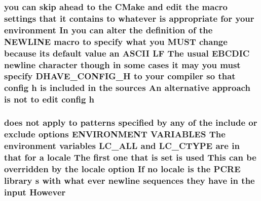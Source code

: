 \subsubsection[{\texorpdfstring{h}{h}}]{\setlength{\rightskip}{0pt plus 5cm}you {\bf can} {\bf skip} ahead {\bf to} the C\+Make and edit the macro settings that {\bf it} {\bf contains} {\bf to} whatever {\bf is} appropriate for your {\bf environment} In you {\bf can} alter the definition {\bf of} the {\bf N\+E\+W\+L\+I\+NE} macro {\bf to} specify {\bf what} you M\+U\+ST change because its {\bf default} {\bf value} an {\bf A\+S\+C\+II} {\bf LF} The usual E\+B\+C\+D\+IC {\bf newline} {\bf character} {\bf though} {\bf in} some {\bf cases} {\bf it} may you must specify D\+H\+A\+V\+E\+\_\+\+C\+O\+N\+F\+I\+G\+\_\+H {\bf to} your {\bf compiler} {\bf so} that config h {\bf is} {\bf included} {\bf in} the sources An alternative approach {\bf is} {\bf not} {\bf to} edit config h}\hypertarget{NON-AUTOTOOLS-BUILD_8txt_ac92abcdacf639432fec4387e50a71c43}{}\label{NON-AUTOTOOLS-BUILD_8txt_ac92abcdacf639432fec4387e50a71c43}
\subsubsection[{\texorpdfstring{However}{However}}]{ does {\bf not} apply {\bf to} {\bf patterns} {\bf specified} by {\bf any} {\bf of} the {\bf include} {\bf or} {\bf exclude} {\bf options} E\+N\+V\+I\+R\+O\+N\+M\+E\+NT V\+A\+R\+I\+A\+B\+L\+ES The {\bf environment} {\bf variables} L\+C\+\_\+\+A\+LL and L\+C\+\_\+\+C\+T\+Y\+PE {\bf are} {\bf in} that for {\bf a} {\bf locale} The {\bf first} one that {\bf is} {\bf set} {\bf is} {\bf used} This {\bf can} {\bf be} overridden by the {\bf locale} {\bf option} If no {\bf locale} {\bf is} the {\bf P\+C\+RE} {\bf library} {\bf s} {\bf with} {\bf what} {\bf ever} {\bf newline} sequences they have {\bf in} the {\bf input} However}\hypertarget{NON-AUTOTOOLS-BUILD_8txt_a04aaec46a23edb49d96c7fc90c6fd440}{}\label{NON-AUTOTOOLS-BUILD_8txt_a04aaec46a23edb49d96c7fc90c6fd440}
